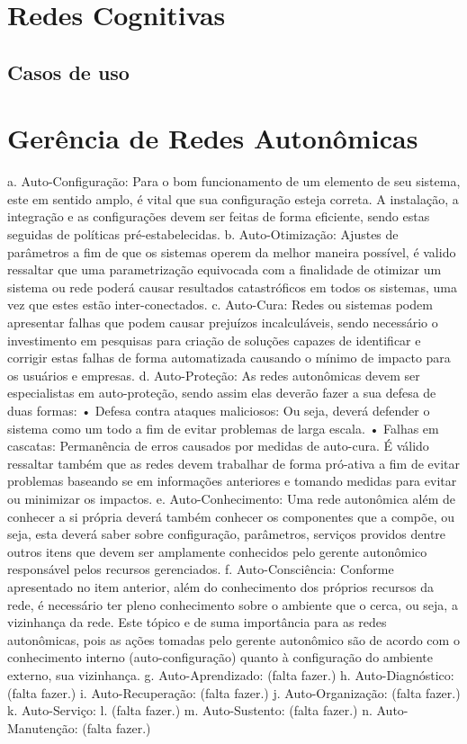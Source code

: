\documentclass[11pt,twoside]{article}
\begin{document}
\section{Redes Cognitivas}
\subsection{Casos de uso}

\section{Gerência de Redes Autonômicas}
a.	Auto-Configuração:
Para o bom funcionamento de um elemento de seu sistema, este em sentido amplo, é vital que sua configuração esteja correta. A instalação, a integração e as configurações devem ser feitas de forma eficiente, sendo estas seguidas de políticas pré-estabelecidas.
b.	Auto-Otimização:
Ajustes de parâmetros a fim de que os sistemas operem da melhor maneira possível, é valido ressaltar que uma parametrização equivocada com a finalidade de otimizar um sistema ou rede poderá causar resultados catastróficos em todos os sistemas, uma vez que estes estão inter-conectados.
c.	Auto-Cura:
Redes ou sistemas podem apresentar falhas que podem causar prejuízos incalculáveis, sendo necessário o investimento em pesquisas para criação de soluções capazes de identificar e corrigir estas falhas de forma automatizada causando o mínimo de impacto para os usuários e empresas.
d.	Auto-Proteção:
As redes autonômicas devem ser especialistas em auto-proteção, sendo assim elas deverão fazer a sua defesa de duas formas: 
•	Defesa contra ataques maliciosos: Ou seja, deverá defender o sistema como um todo a fim de evitar problemas de larga escala.
•	Falhas em cascatas: Permanência de erros causados por medidas de auto-cura.
É válido ressaltar também que as redes devem trabalhar de forma pró-ativa a fim de evitar problemas baseando se em informações anteriores e tomando medidas para evitar ou minimizar os impactos.
e.	Auto-Conhecimento:
Uma rede autonômica além de conhecer a si própria deverá também conhecer os componentes que a compõe, ou seja, esta deverá saber sobre configuração, parâmetros, serviços providos dentre outros itens que devem ser amplamente conhecidos pelo gerente autonômico responsável pelos recursos gerenciados. 
f.	Auto-Consciência:
Conforme apresentado no item anterior, além do conhecimento dos próprios recursos da rede, é necessário ter pleno conhecimento sobre o ambiente que o cerca, ou seja, a vizinhança da rede. Este tópico e de suma importância para as redes autonômicas, pois as ações tomadas pelo gerente autonômico são de acordo com o conhecimento interno (auto-configuração) quanto à configuração do ambiente externo, sua vizinhança.
g.	Auto-Aprendizado:
	(falta fazer.)
h.	Auto-Diagnóstico:
(falta fazer.)
i.	Auto-Recuperação:
	(falta fazer.)
j.	Auto-Organização:
(falta fazer.)
k.	Auto-Serviço:
l.		(falta fazer.)
m.	Auto-Sustento:
	(falta fazer.)
n.	Auto-Manutenção:
	(falta fazer.)
\end{document}
